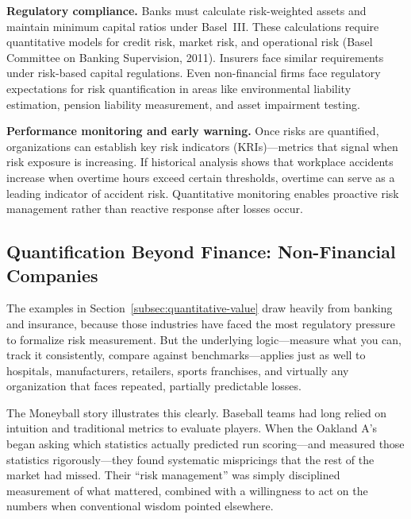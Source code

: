 \documentclass[11pt,openany]{book}
\begin{document}
\textbf{Regulatory compliance.} Banks must calculate risk-weighted assets and
maintain minimum capital ratios under Basel~III. These calculations require
quantitative models for credit risk, market risk, and operational risk
(Basel Committee on Banking Supervision, 2011). Insurers face similar requirements under risk-based capital
regulations. Even non-financial firms face regulatory expectations for risk
quantification in areas like environmental liability estimation, pension
liability measurement, and asset impairment testing.

\textbf{Performance monitoring and early warning.} Once risks are quantified,
organizations can establish key risk indicators (KRIs)---metrics that signal
when risk exposure is increasing. If historical analysis shows that workplace
accidents increase when overtime hours exceed certain thresholds, overtime can
serve as a leading indicator of accident risk. Quantitative monitoring enables
proactive risk management rather than reactive response after losses occur.

\subsection{Quantification Beyond Finance: Non-Financial Companies}
\label{subsec:quantification-nonfinancial}

The examples in Section~\ref{subsec:quantitative-value} draw heavily from
banking and insurance, because those industries have faced the most regulatory
pressure to formalize risk measurement. But the underlying logic---measure what
you can, track it consistently, compare against benchmarks---applies just as
well to hospitals, manufacturers, retailers, sports franchises, and virtually
any organization that faces repeated, partially predictable losses.

The Moneyball story illustrates this clearly. Baseball teams had long relied on
intuition and traditional metrics to evaluate players. When the Oakland A's
began asking which statistics actually predicted run scoring---and measured
those statistics rigorously---they found systematic mispricings that the rest
of the market had missed. Their ``risk management'' was simply disciplined
measurement of what mattered, combined with a willingness to act on the numbers
when conventional wisdom pointed elsewhere.
\end{document}
